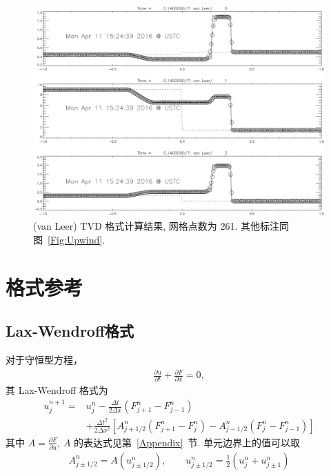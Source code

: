\documentclass[10.5pt
]{article}
\begin{document}
\begin{figure}
\begin{center}
\includegraphics[width=.85\textwidth]{GasvanLeer261.eps}
\caption{(van Leer) TVD 格式计算结果, 网格点数为 261. 其他标注同图~\ref{Fig:Upwind}.}\label{Fig:vanLeerB}
\end{center}
\end{figure}

\section{格式参考}
\subsection{Lax-Wendroff格式}
对于守恒型方程，
\begin{align}
\frac{\partial u}{\partial t} + \frac{\partial F}{\partial x} = 0,
\end{align}
其 Lax-Wendroff 格式为
\begin{align}
u_j^{n+1} =& u_j^n - \frac{\Delta t}{2\Delta x} (F_{j+1}^n - F_{j-1}^n) \nonumber\\
& + \frac{\Delta t^2}{2\Delta x^2} \left[A_{j+1/2}^n (F_{j+1}^n-F_j^n) - A_{j-1/2}^n (F_j^n -
F_{j-1}^n)\right]
\end{align}
其中 $A = \frac{\partial F}{\partial u}$, $A$ 的表达式见第~\ref{Appendix}~节. 单元边界上的值可以取
\begin{align}
A_{j \pm 1/2}^n = A(u_{j \pm 1/2}^n), \qquad u_{j \pm 1/2}^n = \frac{1}{2} (u_j^n + u_{j \pm 1}^n)
\end{align}
\end{document}
